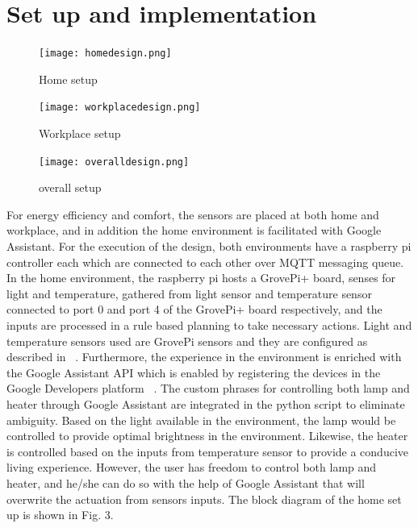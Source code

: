 \documentclass[runningheads]{llncs}
\begin{document}
\section{Set up and implementation}
\begin{figure}
  \centering
  \begin{minipage}[b]{0.55\textwidth}
    \texttt{[image: homedesign.png]}
    \caption{Home setup}
  \end{minipage}
  \hfill
  \begin{minipage}[b]{0.4\textwidth}
    \texttt{[image: workplacedesign.png]}
    \caption{Workplace setup}
  \end{minipage}
\end{figure}

\begin{figure}
        \centering
        \texttt{[image: overalldesign.png]}
        \caption{overall setup}
        \label{fig:correctness}
    \end{figure}
For energy efficiency and comfort, the sensors are placed at both home and workplace, and in addition the home environment is facilitated with Google Assistant. For the execution of the design, both environments have a raspberry pi controller each which are connected to each other over MQTT messaging queue. In the home environment, the raspberry pi hosts a GrovePi+ board, senses for light and temperature, gathered from light sensor and temperature sensor connected to port 0 and port 4 of the GrovePi+ board respectively, and the inputs are processed in a rule based planning to take necessary actions. Light and temperature sensors used are GrovePi sensors and they are configured as described in ~\cite{1}. Furthermore, the experience in the environment is enriched with the Google Assistant API which is enabled by registering the devices in the Google Developers platform ~\cite{ref_url1}. The custom phrases for controlling both lamp and heater through Google Assistant are integrated in the python script to eliminate ambiguity. Based on the light available in the environment, the lamp would be controlled to provide optimal brightness in the environment. Likewise, the heater is controlled based on the inputs from temperature sensor to provide a conducive living experience. However, the user has freedom to control both lamp and heater, and he/she can do so with the help of Google Assistant that will overwrite the actuation from sensors inputs. The block diagram of the home set up is shown in Fig. 3. \newline
\newline
\end{document}
